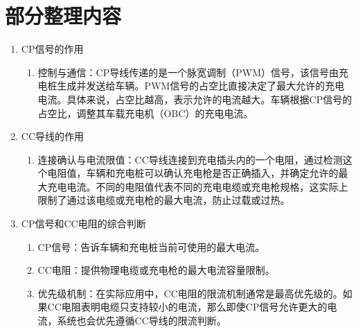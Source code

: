 \section{部分整理内容}
    \begin{enumerate}
        \item  CP信号的作用
            \begin{enumerate}
                \item  控制与通信：CP导线传递的是一个脉宽调制（PWM）信号，该信号由充电桩生成并发送给车辆。PWM信号的占空比直接决定了最大允许的充电电流。具体来说，占空比越高，表示允许的电流越大。车辆根据CP信号的占空比，调整其车载充电机（OBC）的充电电流。
            \end{enumerate}
        \item  CC导线的作用
            \begin{enumerate}
                \item 连接确认与电流限值：CC导线连接到充电插头内的一个电阻，通过检测这个电阻值，车辆和充电桩可以确认充电枪是否正确插入，并确定允许的最大充电电流。不同的电阻值代表不同的充电电缆或充电枪规格，这实际上限制了通过该电缆或充电枪的最大电流，防止过载或过热。  
            \end{enumerate}
        \item CP信号和CC电阻的综合判断
            \begin{enumerate}
                \item CP信号：告诉车辆和充电桩当前可使用的最大电流。
                \item CC电阻：提供物理电缆或充电枪的最大电流容量限制。
                \item 优先级机制：在实际应用中，CC电阻的限流机制通常是最高优先级的。如果CC电阻表明电缆只支持较小的电流，那么即使CP信号允许更大的电流，系统也会优先遵循CC导线的限流判断。
            \end{enumerate}
    \end{enumerate}

